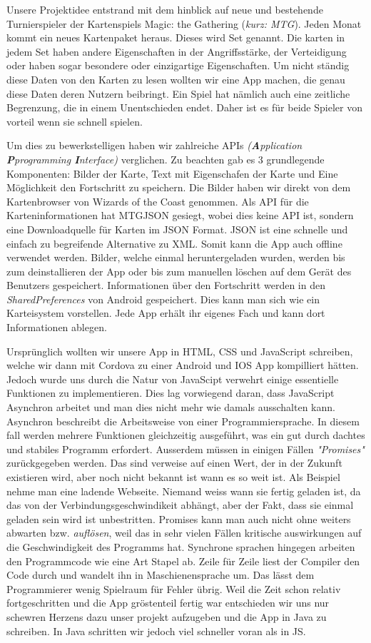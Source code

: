 Unsere Projektidee entstrand mit dem hinblick auf neue und bestehende Turnierspieler der Kartenspiels Magic: the Gathering (\textit{kurz: MTG}).
Jeden Monat kommt ein neues Kartenpaket heraus. Dieses wird Set genannt. Die karten in jedem Set haben andere Eigenschaften in der Angriffsstärke, der Verteidigung oder haben sogar besondere oder einzigartige Eigenschaften. Um nicht ständig diese Daten von den Karten zu lesen wollten wir eine App machen, die genau diese Daten deren Nutzern beibringt.
Ein Spiel hat nämlich auch eine zeitliche Begrenzung, die in einem Unentschieden endet. Daher ist es für beide Spieler von vorteil wenn sie schnell spielen.

Um dies zu bewerkstelligen haben wir zahlreiche APIs \textit{(\textbf{A}pplication \textbf{P}programming \textbf{I}nterface)} verglichen. Zu beachten gab es 3 grundlegende Komponenten: Bilder der Karte, Text mit Eigenschafen der Karte und Eine Möglichkeit den Fortschritt zu speichern. Die Bilder haben wir direkt von dem Kartenbrowser von Wizards of the Coast genommen. Als API für die Karteninformationen hat MTGJSON gesiegt, wobei dies keine API ist, sondern eine Downloadquelle für Karten im JSON Format. JSON ist eine schnelle und einfach zu begreifende Alternative zu XML. Somit kann die App auch offline verwendet werden. Bilder, welche einmal heruntergeladen wurden, werden bis zum deinstallieren der App oder bis zum manuellen löschen auf dem Gerät des Benutzers gespeichert. Informationen über den Fortschritt werden in den \textit{SharedPreferences} von Android gespeichert. Dies kann man sich wie ein Karteisystem vorstellen. Jede App erhält ihr eigenes Fach und kann dort Informationen ablegen.

Ursprünglich wollten wir unsere App in HTML, CSS und JavaScript schreiben, welche wir dann mit Cordova zu einer Android und IOS App kompilliert hätten.
Jedoch wurde uns durch die Natur von JavaScipt verwehrt einige essentielle Funktionen zu implementieren. Dies lag vorwiegend daran, dass JavaScript Asynchron arbeitet und man dies nicht mehr wie damals ausschalten kann. Asynchron beschreibt die Arbeitsweise von einer Programmiersprache. In diesem fall werden mehrere Funktionen gleichzeitig ausgeführt, was ein gut durch dachtes und stabiles Programm erfordert. Ausserdem müssen in einigen Fällen \textit{"Promises"} zurückgegeben werden. Das sind verweise auf einen Wert, der in der Zukunft existieren wird, aber noch nicht bekannt ist wann es so weit ist. Als Beispiel nehme man eine ladende Webseite. Niemand weiss wann sie fertig geladen ist, da das von der Verbindungsgeschwindikeit abhängt, aber der Fakt, dass sie einmal geladen sein wird ist unbestritten. Promises kann man auch nicht ohne weiters abwarten bzw. \textit{auflösen}, weil das in sehr vielen Fällen kritische auswirkungen auf die Geschwindigkeit des Programms hat. Synchrone sprachen hingegen arbeiten den Programmcode wie eine Art Stapel ab. Zeile für Zeile liest der Compiler den Code durch und wandelt ihn in Maschienensprache um. Das lässt dem Programmierer wenig Spielraum für Fehler übrig. Weil die Zeit schon relativ fortgeschritten und die App gröstenteil fertig war entschieden wir uns nur schewren Herzens dazu unser projekt aufzugeben und die App in Java zu schreiben. In Java schritten wir jedoch viel schneller voran als in JS.